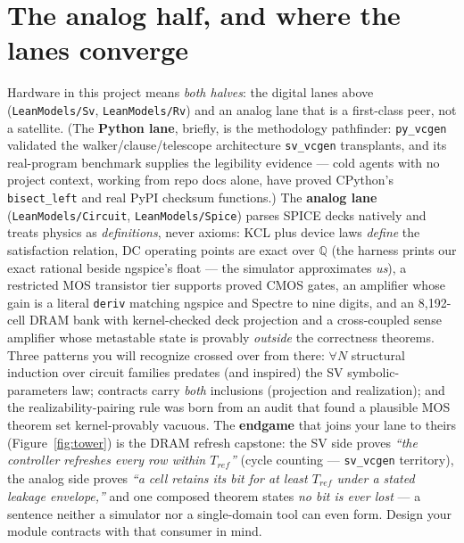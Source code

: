 \documentclass[10pt]{article}
\newcommand{\code}[1]{\texttt{#1}}
\begin{document}
\section{The analog half, and where the lanes converge}
Hardware in this project means \emph{both halves}: the digital lanes above
(\code{LeanModels/Sv}, \code{LeanModels/Rv}) and an analog lane that is a first-class
peer, not a satellite. (The \textbf{Python lane}, briefly, is the methodology pathfinder:
\code{py\_vcgen} validated the walker/clause/telescope architecture \code{sv\_vcgen}
transplants, and its real-program benchmark supplies the legibility evidence --- cold
agents with no project context, working from repo docs alone, have proved CPython's
\code{bisect\_left} and real PyPI checksum functions.) The \textbf{analog lane}
(\code{LeanModels/Circuit}, \code{LeanModels/Spice}) parses SPICE decks natively and
treats physics as \emph{definitions}, never axioms: KCL plus device laws \emph{define}
the satisfaction relation, DC operating points are exact over $\mathbb{Q}$ (the harness
prints our exact rational beside ngspice's float --- the simulator approximates
\emph{us}), a restricted MOS transistor tier supports proved CMOS gates, an amplifier
whose gain is a literal \code{deriv} matching ngspice and Spectre to nine digits, and an
8{,}192-cell DRAM bank with kernel-checked deck projection and a cross-coupled sense
amplifier whose metastable state is provably \emph{outside} the correctness theorems.
Three patterns you will recognize crossed over from there: $\forall N$ structural
induction over circuit families predates (and inspired) the SV symbolic-parameters law;
contracts carry \emph{both} inclusions (projection and realization); and the
realizability-pairing rule was born from an audit that found a plausible MOS theorem set
kernel-provably vacuous. The \textbf{endgame} that joins your lane to theirs (Figure~\ref{fig:tower}) is the DRAM
refresh capstone: the SV side proves \emph{``the controller refreshes every row within
$T_{\mathit{ref}}$''} (cycle counting --- \code{sv\_vcgen} territory), the analog side
proves \emph{``a cell retains its bit for at least $T_{\mathit{ref}}$ under a stated
leakage envelope,''} and one composed theorem states \emph{no bit is ever lost} --- a
sentence neither a simulator nor a single-domain tool can even form. Design your module
contracts with that consumer in mind.
\end{document}
